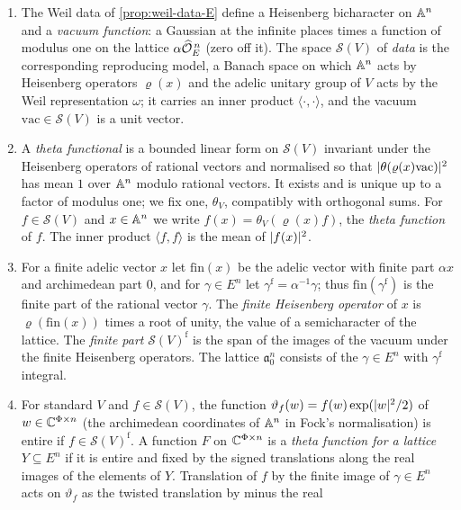 \begin{enumerate}[label=\textup{(W\arabic*)}]
\item The Weil data of \cref{prop:weil-data-E} define a Heisenberg bicharacter on $\mathbb{A}^n$ and a
\emph{vacuum function}: a Gaussian at the infinite places times a function of modulus one on the
lattice $\alpha\widehat{\mathcal{O}}_E^{\,n}$ (zero off it). The space $\mathcal S(V)$ of \emph{data} is the
corresponding reproducing model, a Banach space on which $\mathbb{A}^n$ acts by Heisenberg operators
$\varrho(x)$ and the adelic unitary group of $V$ acts by the Weil representation $\omega$; it carries
an inner product $\langle\cdot,\cdot\rangle$, and the vacuum $\mathrm{vac}\in\mathcal S(V)$ is a unit
vector.
\item A \emph{theta functional} is a bounded linear form on $\mathcal S(V)$ invariant under the
Heisenberg operators of rational vectors and normalised so that $\lvert \theta(\varrho(x)\mathrm{vac})\rvert^2$
has mean $1$ over $\mathbb{A}^n$ modulo rational vectors. It exists and is unique up to a factor of
modulus one; we fix one, $\theta_V$, compatibly with orthogonal sums. For $f\in\mathcal S(V)$ and
$x\in\mathbb{A}^n$ we write $f(x)=\theta_V(\varrho(x)f)$, the \emph{theta function} of $f$. The inner
product $\langle f,f\rangle$ is the mean of $\lvert f(x)\rvert^2$.
\item For a finite adelic vector $x$ let $\mathrm{fin}(x)$ be the adelic vector with finite part
$\alpha x$ and archimedean part $0$, and for $\gamma\in E^n$ let $\gamma^{\mathrm f}=\alpha^{-1}\gamma$;
thus $\mathrm{fin}(\gamma^{\mathrm f})$ is the finite part of the rational vector $\gamma$. The
\emph{finite Heisenberg operator} of $x$ is $\varrho(\mathrm{fin}(x))$ times a root of unity, the
value of a semicharacter of the lattice. The \emph{finite part} $\mathcal S(V)^{\mathrm f}$ is the
span of the images of the vacuum under the finite Heisenberg operators. The lattice
$\mathfrak a_0^n$ consists of the $\gamma\in E^n$ with $\gamma^{\mathrm f}$ integral.
\item For standard $V$ and $f\in\mathcal S(V)$, the function
$\vartheta_f(w)=f(w)\exp(\lvert w\rvert^2/2)$ of $w\in\mathbb{C}^{\Phi\times n}$ (the archimedean coordinates of
$\mathbb{A}^n$ in Fock's normalisation) is entire if $f\in\mathcal S(V)^{\mathrm f}$. A function $F$ on
$\mathbb{C}^{\Phi\times n}$ is a \emph{theta function for a lattice $Y\subseteq E^n$} if it is entire and
fixed by the signed translations along the real images of the elements of $Y$. Translation of $f$ by
the finite image of $\gamma\in E^n$ acts on $\vartheta_f$ as the twisted translation by minus the real

\end{enumerate}
